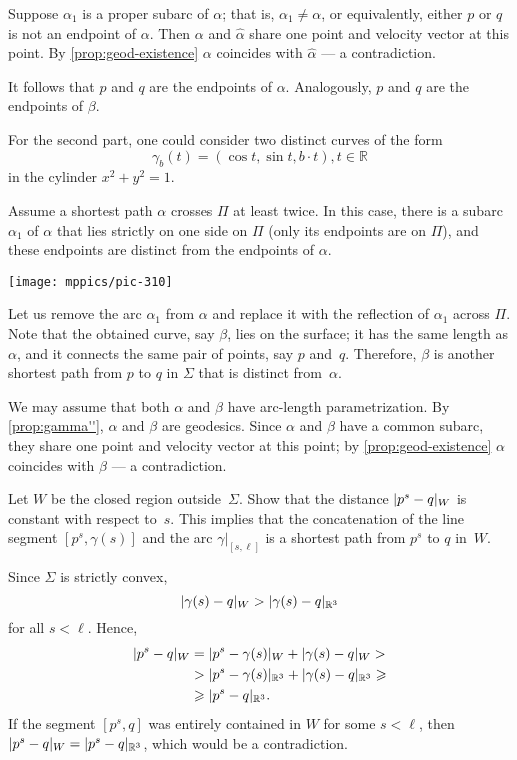 \begin{multicols}{2}
Suppose $\alpha_1$ is a proper subarc of $\alpha$;
that is, $\alpha_1\ne\alpha$, or equivalently, either $p$ or $q$ is not an endpoint of $\alpha$.
Then $\alpha$ and $\hat\alpha$ share one point and velocity vector at this point.
By \ref{prop:geod-existence} $\alpha$ coincides with $\hat\alpha$ --- a contradiction.

It follows that $p$ and $q$ are the endpoints of $\alpha$.
Analogously, $p$ and $q$ are the endpoints of $\beta$.

For the second part, one could consider two distinct curves of the form 
\[ \gamma_b(t) = ( \cos t , \sin t , b\cdot t ) , t \in \mathbb{R} \]
in the cylinder $x^2 + y^2 =1$.

Assume a shortest path $\alpha$ crosses $\Pi$ at least twice.
In this case, there is a subarc $\alpha_1$ of $\alpha$ that lies strictly on one side on $\Pi$ (only its endpoints are on $\Pi$), and these endpoints are distinct from the endpoints of $\alpha$.
 
\begin{Figure}
\vskip-1mm
\centering
\texttt{[image: mppics/pic-310]}
\vskip-1mm
\end{Figure}

Let us remove the arc $\alpha_1$ from $\alpha$ and replace it with the reflection of $\alpha_1$ across $\Pi$.
Note that the obtained curve, say $\beta$, lies on the surface;
it has the same length as $\alpha$, and it connects the same pair of points, say $p$ and~$q$.
Therefore, $\beta$ is another shortest path from $p$ to $q$ in $\Sigma$ that is distinct from~$\alpha$.

We may assume that both $\alpha$ and $\beta$ have arc-length parametrization.
By \ref{prop:gamma''}, $\alpha$ and $\beta$ are geodesics.
Since $\alpha$ and $\beta$ have a common subarc, they share one point and velocity vector at this point;
by \ref{prop:geod-existence} $\alpha$ coincides with $\beta$ --- a contradiction.


Let $W$ be the closed region outside~$\Sigma$.
Show that the distance $\dist{p^s}{q}W$ is constant with respect to~$s$.
This implies that the concatenation of the line segment $[p^s,\gamma(s)]$ and the arc $\gamma|_{[s,\ell]}$ is a shortest path from $p^s$ to $q$ in~$W$.

Since $\Sigma$ is strictly convex, 
\[ \dist{\gamma (s)}{q}W > \dist{\gamma(s)}{q}{\mathbb{R}^3} \]
for all $s < \ell$.
Hence,
\begin{align*}
\dist{p^s}{q}W&=\dist{p^s}{\gamma(s)}W+\dist{\gamma (s)}{q}W 
> 
\\
&>\dist{p^s}{\gamma(s)}{\mathbb{R}^3} + \dist{ \gamma (s)}{q}{\mathbb{R}^3} 
\ge
\\
&\ge\dist{p^s}{q}{\mathbb{R}^3}. 
\end{align*}
If the segment $[p^s,q]$ was entirely contained in $W$ for some $s<\ell$, then $\dist{p^s}{q}W = \dist{p^s}{q}{\mathbb{R}^3} $, which would be a contradiction.


\end{multicols}
